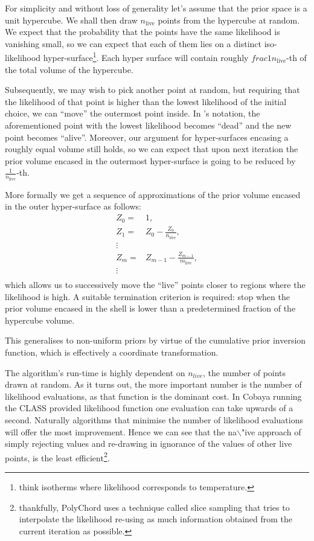 \documentclass[usenatbib]{mnras}
\begin{document}
For simplicity and without loss of generality let's assume that the
prior space is a unit hypercube.  We shall then draw
\(n_\text{live}\) points from the hypercube at random. We expect
that the probability that the points have the same likelihood is
vanishing small, so we can expect that each of them lies on a
distinct iso-likelihood hyper-surface\footnote{think isotherms  where likelihood corresponds to temperature.}. Each hyper surface
will contain roughly \(frac{1}{n_\text{live}}\)-th of the total
volume of the hypercube.

Subsequently, we may wish to pick another point at random, but
requiring that the likelihood of that point is higher than the
lowest likelihood of the initial choice, we can ``move'' the
outermost point inside. In \citeauthor{skilling2006} 's notation, the
aforementioned point with the lowest likelihood becomes ``dead''
and the new point becomes ``alive''. Moreover, our argument for
hyper-surfaces encasing a roughly equal volume still holds, so we
can expect that upon next iteration the prior volume encased in the
outermost hyper-surface is going to be reduced by \(\frac{1}{n_\text{live}}\)-th. 

More formally we get a sequence of approximations of the prior
volume encased in the outer hyper-surface as follows:
\begin{eqnarray}
  Z_{0} = &1,\\
  Z_{1} = &Z_{0} - \frac{Z_{0}}{n_\text{live}},\\
  \vdots\\
  Z_{m} = &Z_{m-1} - \frac{Z_{m-1}}{m_\text{live}},\\
  \vdots\\
\end{eqnarray}
which allows us to successively move the ``live'' points closer to
regions where the likelihood is high. A suitable termination
criterion is required: stop when the prior volume encased in the
shell is lower than a predetermined fraction of the hypercube
volume. 

This generalises to non-uniform priors by virtue of the cumulative
prior inversion function, which is effectively a coordinate
transformation.

The algorithm's run-time is highly dependent on \(n_{live}\), the
number of points drawn at random. As it turns out, the more
important number is the number of likelihood evaluations, as that
function is the dominant cost. In Cobaya running the CLASS provided
likelihood function one evaluation can take upwards of a
second. Naturally algorithms that minimise the number of likelihood
evaluations will offer the most improvement. Hence we can see that
the na$\backslash$"ive approach of simply rejecting values and re-drawing in
ignorance of the values of other live points, is the least
efficient\footnote{thankfully, PolyChord uses a technique called slice   sampling that tries to interpolate the likelihood re-using as much  information obtained from the current iteration as possible.}.
\end{document}
